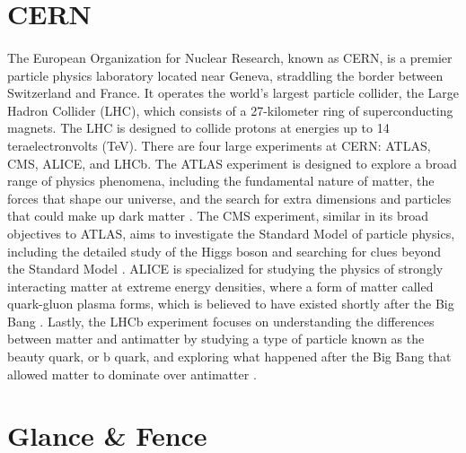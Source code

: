 \section{CERN}

\paragraph{}The European Organization for Nuclear Research, known as CERN, is a premier particle physics laboratory located near Geneva, straddling the border between Switzerland and France. It operates the world's largest particle collider, the Large Hadron Collider (LHC), which consists of a 27-kilometer ring of superconducting magnets. The LHC is designed to collide protons at energies up to 14 teraelectronvolts (TeV)\cite{LHC_Description}. There are four large experiments at CERN: ATLAS, CMS, ALICE, and LHCb. The ATLAS experiment is designed to explore a broad range of physics phenomena, including the fundamental nature of matter, the forces that shape our universe, and the search for extra dimensions and particles that could make up dark matter \cite{ATLAS_Description}. The CMS experiment, similar in its broad objectives to ATLAS, aims to investigate the Standard Model of particle physics, including the detailed study of the Higgs boson and searching for clues beyond the Standard Model \cite{CMS_Description}. ALICE is specialized for studying the physics of strongly interacting matter at extreme energy densities, where a form of matter called quark-gluon plasma forms, which is believed to have existed shortly after the Big Bang \cite{ALICE_Description}. Lastly, the LHCb experiment focuses on understanding the differences between matter and antimatter by studying a type of particle known as the beauty quark, or b quark, and exploring what happened after the Big Bang that allowed matter to dominate over antimatter \cite{LHCb_Description}.

\section{Glance \& Fence}

